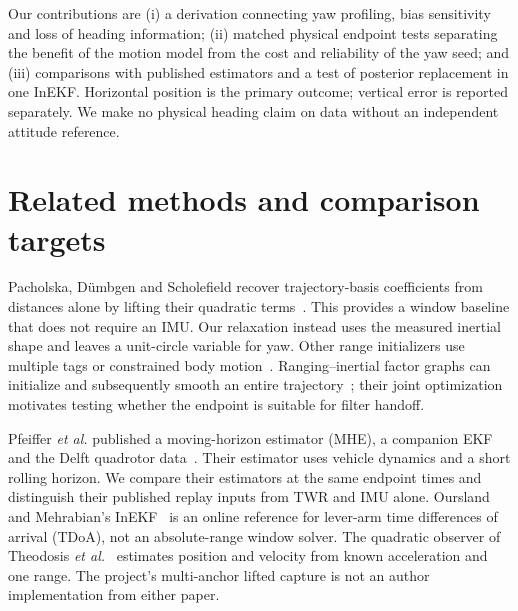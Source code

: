 \documentclass[conference,letterpaper,10pt]{IEEEtran}
\begin{document}
Our contributions are (i) a derivation connecting yaw profiling, bias sensitivity and loss of heading information; (ii) matched physical endpoint tests separating the benefit of the motion model from the cost and reliability of the yaw seed; and (iii) comparisons with published estimators and a test of posterior replacement in one InEKF. Horizontal position is the primary outcome; vertical error is reported separately. We make no physical heading claim on data without an independent attitude reference.

\section{Related methods and comparison targets}
Pacholska, D\"umbgen and Scholefield recover trajectory-basis coefficients from distances alone by lifting their quadratic terms~\cite{pacholska}. This provides a window baseline that does not require an IMU. Our relaxation instead uses the measured inertial shape and leaves a unit-circle variable for yaw. Other range initializers use multiple tags or constrained body motion~\cite{goudar}. Ranging--inertial factor graphs can initialize and subsequently smooth an entire trajectory~\cite{jiang}; their joint optimization motivates testing whether the endpoint is suitable for filter handoff.

Pfeiffer \emph{et al.} published a moving-horizon estimator (MHE), a companion EKF and the Delft quadrotor data~\cite{pfeiffer,delftdata}. Their estimator uses vehicle dynamics and a short rolling horizon. We compare their estimators at the same endpoint times and distinguish their published replay inputs from TWR and IMU alone. Oursland and Mehrabian's InEKF~\cite{oursland} is an online reference for lever-arm time differences of arrival (TDoA), not an absolute-range window solver. The quadratic observer of Theodosis \emph{et al.}~\cite{theodosis} estimates position and velocity from known acceleration and one range. The project's multi-anchor lifted capture is not an author implementation from either paper.
\end{document}
